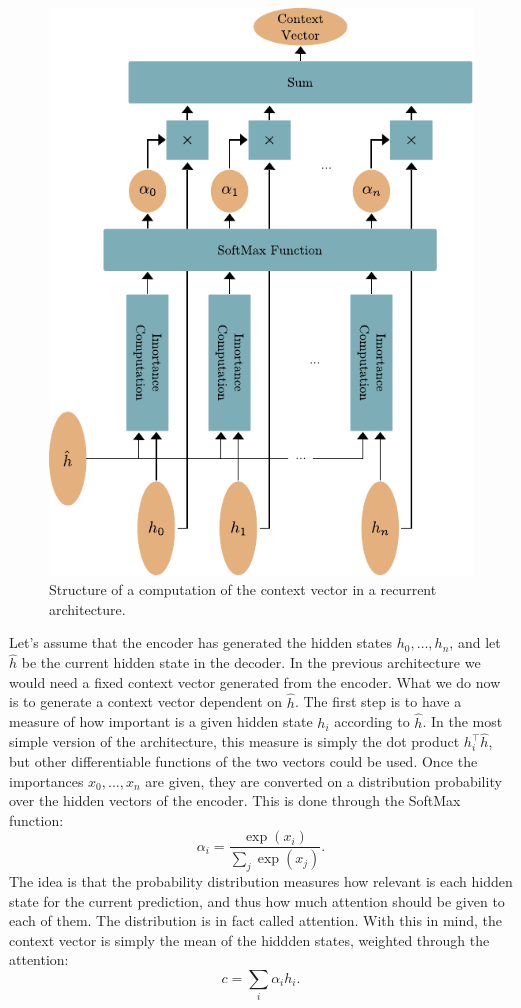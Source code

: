 \documentclass[]{marticle}
\begin{document}
\begin{figure}[!tb] 
\begin{center}
\includegraphics{context_with_attention.pdf}
\caption{Structure of a computation of the context vector in a recurrent architecture.} 
\label{fig:attention-simple} 
\end{center}
\end{figure}

Let's assume that the encoder has generated the hidden states $h_0, \dots, h_n$, and let $\hat{h}$ be
the current hidden state in the decoder. In the previous architecture we would need a fixed context
vector generated from the encoder. What we do now is to generate a context vector dependent on
$\hat{h}$. The first step is to have a measure of how important is a given hidden state $h_i$
according to $\hat{h}$. In the most simple version of the architecture, this measure is simply the
dot product $h_i^\top \hat{h}$, but other differentiable functions of the two vectors could be used.
Once the importances $x_0, ..., x_n$ are given, they are converted on a distribution probability
over the hidden vectors of the encoder. This is done through the SoftMax function:
$$ \alpha_i = \frac{\exp (x_i)}{\sum_j \exp (x_j)}. $$ 
The idea is that the probability distribution measures how relevant is each hidden state for the
current prediction, and thus how much attention should be given to each of them. The distribution is
in fact called attention. With this in mind, the context vector is simply the mean of the hiddden
states, weighted through the attention:
$$ c = \sum_i \alpha_i h_i. $$
\end{document}
